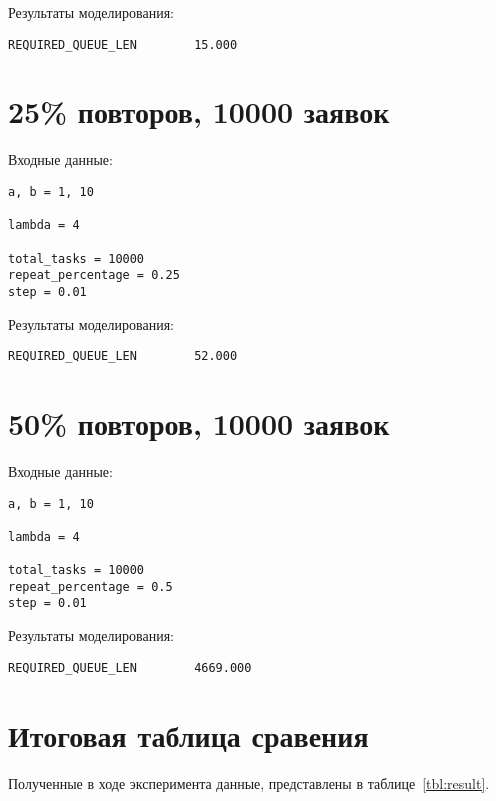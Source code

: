 Результаты моделирования:

\begin{verbatim}
REQUIRED_QUEUE_LEN        15.000
\end{verbatim}

\section{25\% повторов, 10000 заявок}

Входные данные:

\begin{verbatim}
a, b = 1, 10

lambda = 4

total_tasks = 10000
repeat_percentage = 0.25
step = 0.01
\end{verbatim}

Результаты моделирования:

\begin{verbatim}
REQUIRED_QUEUE_LEN        52.000                            
\end{verbatim}

\section{50\% повторов, 10000 заявок}

Входные данные:

\begin{verbatim}
a, b = 1, 10

lambda = 4

total_tasks = 10000
repeat_percentage = 0.5
step = 0.01
\end{verbatim}

Результаты моделирования:

\begin{verbatim}
REQUIRED_QUEUE_LEN        4669.000                            
\end{verbatim}

\section{Итоговая таблица сравения}

Полученные в ходе эксперимента данные, представлены в таблице~\ref{tbl:result}.

